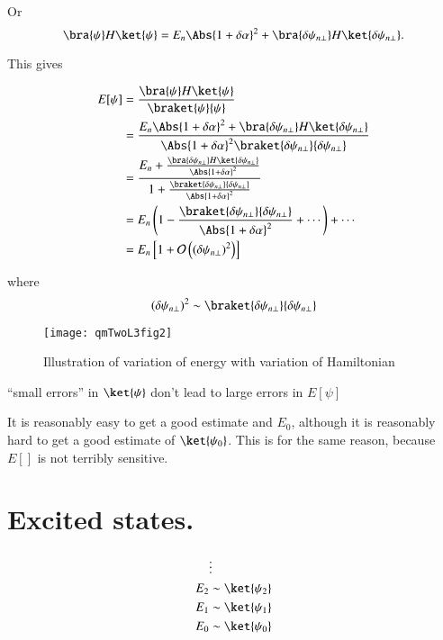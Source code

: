 Or
\begin{equation}\label{eqn:qmTwoL3:130}
\bra{\psi} H \ket{\psi}
= 
E_n \Abs{1 + \delta \alpha }^2
+
\bra{\delta \psi_{n \perp}} H \ket{\delta \psi_{n \perp}}.
\end{equation}

This gives

\begin{align*}
E[\psi] 
&= 
\frac{
\bra{\psi} H \ket{\psi}
}
{
\braket{\psi}{\psi}
} \\
&=
\frac{
E_n \Abs{1 + \delta \alpha }^2 + 
\bra{\delta \psi_{n \perp}} H \ket{\delta \psi_{n \perp}}
}
{
\Abs{1 + \delta \alpha }^2
\braket{\delta \psi_{n \perp}}{\delta \psi_{n \perp}} 
} \\
&=
\frac{
E_n 
+ 
\frac{\bra{\delta \psi_{n \perp}} H \ket{\delta \psi_{n \perp}} }
{\Abs{1 + \delta \alpha }^2}
}
{
1
+\frac{\braket{\delta \psi_{n \perp}}{\delta \psi_{n \perp}} }
{\Abs{1 + \delta \alpha }^2}
} \\
&=
E_n \left( 1 - 
\frac{\braket{\delta \psi_{n \perp}}{\delta \psi_{n \perp}} }
{\Abs{1 + \delta \alpha }^2}
+ \cdots \right) + \cdots \\
&=
E_n\left[1 + \mathcal{O}\left((\delta \psi_{n \perp})^2\right)\right]
\end{align*}

where
\begin{equation}\label{eqn:qmTwoL3:150}
(\delta \psi_{n \perp})^2
\sim
\braket{\delta \psi_{n \perp}}{\delta \psi_{n \perp}}
\end{equation}

\begin{figure}[htp]
\centering
\texttt{[image: qmTwoL3fig2]}
\caption{Illustration of variation of energy with variation of Hamiltonian}\label{fig:qmTwoL3:2}
\end{figure}

``small errors'' in $\ket{\psi}$ don't lead to large errors in $E[\psi]$

It is reasonably easy to get a good estimate and $E_0$, although it is reasonably hard to get a good estimate of $\ket{\psi_0}$.  This is for the same reason, because $E[]$ is not terribly sensitive.

\section{Excited states.}

\begin{align*}
&\vdots \\
E_2 &\sim \ket{\psi_2} \\
E_1 &\sim \ket{\psi_1} \\
E_0 &\sim \ket{\psi_0}
\end{align*}

